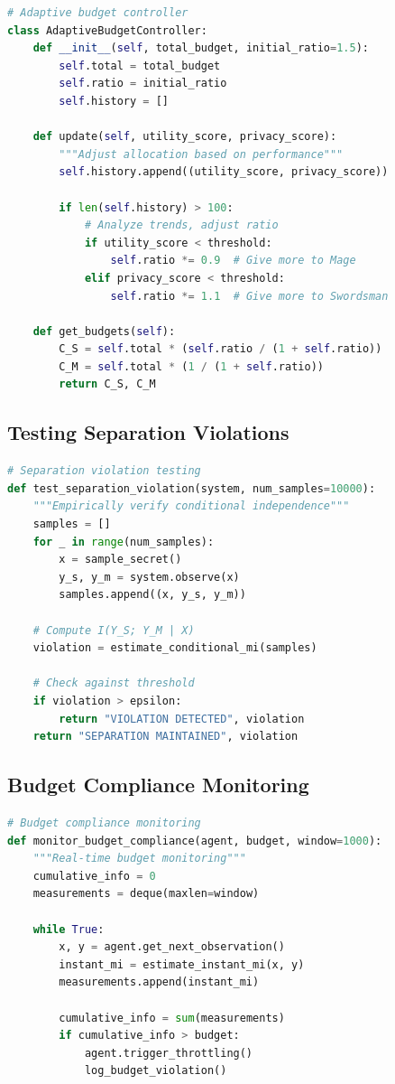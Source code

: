 \documentclass[11pt,a4paper]{article}
\theoremstyle{definition}
\begin{document}
\begin{lstlisting}[language=Python, caption=Adaptive budget controller]
# Adaptive budget controller
class AdaptiveBudgetController:
    def __init__(self, total_budget, initial_ratio=1.5):
        self.total = total_budget
        self.ratio = initial_ratio
        self.history = []
        
    def update(self, utility_score, privacy_score):
        """Adjust allocation based on performance"""
        self.history.append((utility_score, privacy_score))
        
        if len(self.history) > 100:
            # Analyze trends, adjust ratio
            if utility_score < threshold:
                self.ratio *= 0.9  # Give more to Mage
            elif privacy_score < threshold:
                self.ratio *= 1.1  # Give more to Swordsman
                
    def get_budgets(self):
        C_S = self.total * (self.ratio / (1 + self.ratio))
        C_M = self.total * (1 / (1 + self.ratio))
        return C_S, C_M
\end{lstlisting}

\subsection{Testing Separation Violations}

\begin{lstlisting}[language=Python, caption=Separation violation testing]
# Separation violation testing
def test_separation_violation(system, num_samples=10000):
    """Empirically verify conditional independence"""
    samples = []
    for _ in range(num_samples):
        x = sample_secret()
        y_s, y_m = system.observe(x)
        samples.append((x, y_s, y_m))
    
    # Compute I(Y_S; Y_M | X)
    violation = estimate_conditional_mi(samples)
    
    # Check against threshold
    if violation > epsilon:
        return "VIOLATION DETECTED", violation
    return "SEPARATION MAINTAINED", violation
\end{lstlisting}

\subsection{Budget Compliance Monitoring}

\begin{lstlisting}[language=Python, caption=Budget compliance monitoring]
# Budget compliance monitoring
def monitor_budget_compliance(agent, budget, window=1000):
    """Real-time budget monitoring"""
    cumulative_info = 0
    measurements = deque(maxlen=window)
    
    while True:
        x, y = agent.get_next_observation()
        instant_mi = estimate_instant_mi(x, y)
        measurements.append(instant_mi)
        
        cumulative_info = sum(measurements)
        if cumulative_info > budget:
            agent.trigger_throttling()
            log_budget_violation()
\end{lstlisting}
\end{document}
